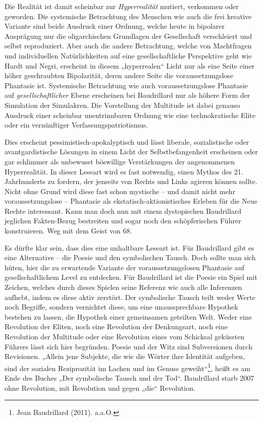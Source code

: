 \documentclass[a4paper,11pt]{article}
\begin{document}
Die Realität ist damit scheinbar zur \emph{Hyperrealität} mutiert, verkommen
oder geworden. Die systemische Betrachtung des Menschen wie auch die frei
kreative Variante sind beide Ausdruck einer Ordnung, welche heute in bipolarer
Ausprägung nur die oligarchischen Grundlagen der Gesellschaft verschleiert und
selbst reproduziert. Aber auch die andere Betrachtung, welche von Machtfragen
und individuellen Natürlichkeiten auf eine gesellschaftliche Perspektive geht
wie Hardt und Negri, erscheint in diesem „hyperrealen“ Licht nur als eine
Seite einer höher geschraubten Bipolarität, deren andere Seite die
voraussetzungslose Phantasie ist.  Systemische Betrachtung wie auch
voraussetzungslose Phantasie auf \emph{gesellschaftlicher} Ebene erscheinen
bei Baudrillard nur als höhere Form der Simulation der Simulakren.  Die
Vorstellung der Multitude ist dabei genauso Ausdruck einer scheinbar
unentrinnbaren Ordnung wie eine technokratische Elite oder ein vernünftiger
Verfassungspatriotismus.

Dies erscheint pessimistisch-apokalyptisch und lässt liberale, sozialistische
oder avantgardistische Lösungen in einem Licht der Selbstbefangenheit
erscheinen oder gar schlimmer als unbewusst böswillige Verstärkungen der
angenommenen Hyperrealität. In dieser Leseart wird es fast notwendig, einen
Mythos des 21. Jahrhunderts zu fordern, der jenseits von Rechts und Links
agieren können sollte. Nicht ohne Grund wird diese fast schon mystische -- und
damit nicht mehr voraussetzungslose -- Phantasie als
ekstatisch-aktionistisches Erleben für die Neue Rechte interessant. Kann man
doch nun mit einem dystopischen Baudrillard jeglichen Fakten-Bezug bestreiten
und sogar noch den schöpferischen Führer konstruieren. Weg mit dem Geist von
68.

Es dürfte klar sein, dass dies eine unhaltbare Leseart ist. Für Baudrillard
gibt es eine Alternative -- die Poesie und den symbolischen Tausch. Doch
sollte man sich hüten, hier die zu erwartende Variante der voraussetzungslosen
Phantasie auf gesellschaftlichem Level zu entdecken. Für Baudrillard ist die
Poesie ein Spiel mit Zeichen, welches durch dieses Spielen seine Referenz wie
auch alle Inferenzen aufhebt, indem es diese aktiv zerstört. Der symbolische
Tausch teilt weder Werte noch Begriffe, sondern vernichtet diese, um eine
unaussprechbare Hypothek bestehen zu lassen, die Hypothek einer gemeinsamen
geteilten Welt. Weder eine Revolution der Eliten, noch eine Revolution der
Denkungsart, noch eine Revolution der Multitude oder eine Revolution eines vom
Schicksal geküssten Führers lässt sich hier begründen. Poesie und der Witz
sind Subversionen durch Revisionen. „Allein jene Subjekte, die wie die Wörter
ihre Identität aufgeben, sind der sozialen Reziprozität im Lachen und im
Genuss geweiht“\footnote{Jean Baudrillard (2011). a.a.O.}, heißt es am Ende
des Buches „Der symbolische Tausch und der Tod“. Baudrillard starb 2007 ohne
Revolution, mit Revolution und gegen „die“ Revolution.
\end{document}
